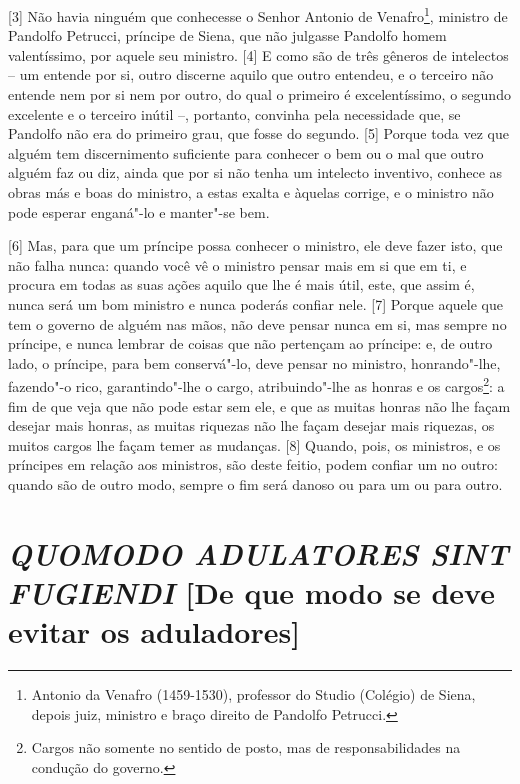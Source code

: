 {[}3{]} Não havia ninguém que conhecesse o Senhor Antonio de
Venafro\footnote{Antonio da Venafro (1459-1530), professor do Studio
  (Colégio) de Siena, depois juiz, ministro e braço direito de Pandolfo
  Petrucci.}, ministro de Pandolfo Petrucci, príncipe de Siena, que não
julgasse Pandolfo homem valentíssimo, por aquele seu ministro. {[}4{]} E
como são de três gêneros de intelectos -- um entende por si, outro
discerne aquilo que outro entendeu, e o terceiro não entende nem por si
nem por outro, do qual o primeiro é excelentíssimo, o segundo excelente
e o terceiro inútil --, portanto, convinha pela necessidade que, se
Pandolfo não era do primeiro grau, que fosse do segundo. {[}5{]} Porque
toda vez que alguém tem discernimento suficiente para conhecer o bem ou
o mal que outro alguém faz ou diz, ainda que por si não tenha um
intelecto inventivo, conhece as obras más e boas do ministro, a estas
exalta e àquelas corrige, e o ministro não pode esperar enganá"-lo e
manter"-se bem.

{[}6{]} Mas, para que um príncipe possa conhecer o ministro, ele deve
fazer isto, que não falha nunca: quando você vê o ministro pensar mais
em si que em ti, e procura em todas as suas ações aquilo que lhe é mais
útil, este, que assim é, nunca será um bom ministro e nunca poderás
confiar nele. {[}7{]} Porque aquele que tem o governo de alguém nas
mãos, não deve pensar nunca em si, mas sempre no príncipe, e nunca
lembrar de coisas que não pertençam ao príncipe: e, de outro lado, o
príncipe, para bem conservá"-lo, deve pensar no ministro, honrando"-lhe,
fazendo"-o rico, garantindo"-lhe o cargo, atribuindo"-lhe as honras e os
cargos\footnote{Cargos não somente no sentido de posto, mas de
  responsabilidades na condução do governo.}: a fim de que veja que não
pode estar sem ele, e que as muitas honras não lhe façam desejar mais
honras, as muitas riquezas não lhe façam desejar mais riquezas, os
muitos cargos lhe façam temer as mudanças. {[}8{]} Quando, pois, os
ministros, e os príncipes em relação aos ministros, são deste feitio,
podem confiar um no outro: quando são de outro modo, sempre o fim será
danoso ou para um ou para outro.

\quebra\section{\emph{QUOMODO ADULATORES SINT FUGIENDI}
{[}De que modo se deve evitar os aduladores{]}}

